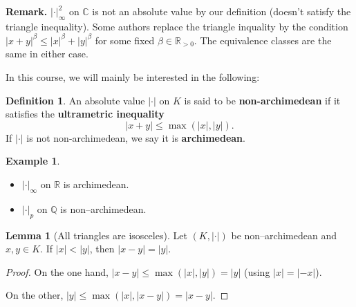 \documentclass{article}
\theoremstyle{definition}
\newtheorem{lemma}[theorem]{Lemma}
\newtheorem{example}{Example}[section]
\newtheorem{defn}{Definition}[section]
\begin{document}
\textbf{Remark.} $|\cdot|_{\infty}^2$ on $\mathbb{C}$ is not an absolute value by our definition (doesn't satisfy the triangle inequality). Some authors replace the triangle inquality by the condition $|x+y|^{\beta} \le |x|^{\beta} + |y|^{\beta}$ for some fixed $\beta \in \mathbb{R}_{>0}$. The equivalence classes are the same in either case.

In this course, we will mainly be interested in the following:

\begin{defn}
    An absolute value $|\cdot|$ on $K$ is said to be \textbf{non-archimedean} if it satisfies the \textbf{ultrametric inequality} \[
    |x+y|\le \max(|x|,|y|).
    \]
    If $|\cdot|$ is not non-archimedean, we say it is \textbf{archimedean}. 
\end{defn}
\begin{example}
    \begin{itemize}
        \item $|\cdot|_{\infty}$ on $\mathbb{R}$ is archimedean.
        \item $|\cdot|_{p}$ on $\mathbb{Q}$ is non--archimedean.
    \end{itemize}
\end{example}

\begin{lemma}[All triangles are isosceles]
    Let $(K, |\cdot|)$ be non--archimedean and $x,y \in K$. If $|x|<|y|$, then $|x-y|= |y|$.
\end{lemma}
\begin{proof}
    On the one hand, $|x-y|\le \max(|x|,|y|) = |y|$ (using $|x|=|-x|$).
    \vspace{1mm}
     
    On the other, $|y| \le \max(|x|, |x-y|) = |x-y|$.
\end{proof}
\end{document}

